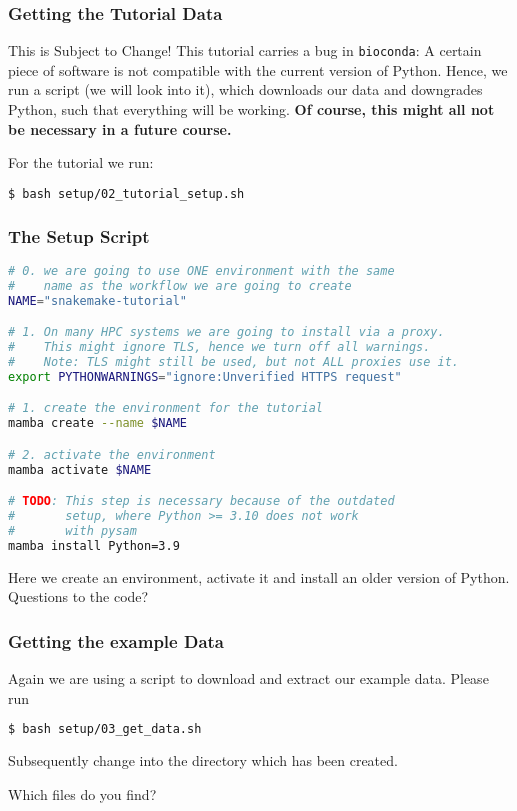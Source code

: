 \begin{frame}[fragile]
  \frametitle{Getting the Tutorial Data}
  \begin{alertblock}{This is Subject to Change!}
   This tutorial carries a bug in \texttt{bioconda}: A certain piece of software is not compatible
   with the current version of Python. Hence, we run a script (we will look into it), which downloads
   our data and downgrades Python, such that everything will be working.\newline
   \textbf{Of course, this might all not be necessary in a future course.}
  \end{alertblock}
  \pause
  For the tutorial we run:
  \begin{lstlisting}[language=Bash, style=Shell]
$ bash setup/02_tutorial_setup.sh
  \end{lstlisting}
\end{frame}

\begin{frame}[fragile]
  \frametitle{The Setup Script}
  \begin{lstlisting}[language=Bash, style=Shell, basicstyle=\tiny]
# 0. we are going to use ONE environment with the same
#    name as the workflow we are going to create
NAME="snakemake-tutorial"

# 1. On many HPC systems we are going to install via a proxy.
#    This might ignore TLS, hence we turn off all warnings.
#    Note: TLS might still be used, but not ALL proxies use it.
export PYTHONWARNINGS="ignore:Unverified HTTPS request"

# 1. create the environment for the tutorial
mamba create --name $NAME

# 2. activate the environment
mamba activate $NAME

# TODO: This step is necessary because of the outdated 
#       setup, where Python >= 3.10 does not work
#       with pysam
mamba install Python=3.9
  \end{lstlisting}
  Here we create an environment, activate it and install an older version of Python. Questions to the code?
\end{frame}

\begin{frame}[fragile]
  \frametitle{Getting the example Data}
  Again we are using a script to download and extract our example data. Please run
  \begin{lstlisting}[language=Bash, style=Shell]
$ bash setup/03_get_data.sh
  \end{lstlisting}
  Subsequently change into the directory  which has been created. 
  \pause
  \begin{question}
  	Which files do you find?
  \end{question}
\end{frame}

